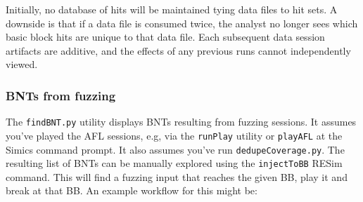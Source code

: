 \documentclass[titlepage]{article}
\begin{document}
Initially, no database of hits will be maintained tying data files to hit sets.  A downside is that if a data file is consumed twice, the analyst no longer sees
which basic block hits are unique to that data file. Each subsequent data session artifacts are additive, and the effects of any previous runs cannot independently viewed.

\subsubsection{BNTs from fuzzing}
\label{BNT-fuzz}
The {\tt findBNT.py} utility displays BNTs resulting from fuzzing sessions.  It assumes you've played the AFL sessions, e.g, via the {\tt runPlay} utility or {\tt playAFL}
at the Simics command prompt.  It also assumes you've run {\tt dedupeCoverage.py}.  The resulting list of BNTs can be manually explored using the {\tt injectToBB}
RESim command.  This will find a fuzzing input that reaches the given BB, play it and break at that BB.  An example workflow for this might be:
\end{document}
